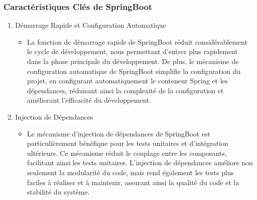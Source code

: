 \documentclass{article}
\begin{document}
\subsubsection{Caractéristiques Clés de SpringBoot}
\begin{enumerate}
    \item Démarrage Rapide et Configuration Automatique
    \begin{itemize}
        \item La fonction de démarrage rapide de SpringBoot réduit considérablement le cycle de développement, nous permettant d'entrer plus rapidement dans la phase principale du développement. De plus, le mécanisme de configuration automatique de SpringBoot simplifie la configuration du projet, en configurant automatiquement le conteneur Spring et les dépendances, réduisant ainsi la complexité de la configuration et améliorant l'efficacité du développement.
    \end{itemize}
    \item Injection de Dépendances
    \begin{itemize}
        \item Le mécanisme d'injection de dépendances de SpringBoot est particulièrement bénéfique pour les tests unitaires et d'intégration ultérieurs. Ce mécanisme réduit le couplage entre les composants, facilitant ainsi les tests unitaires. L'injection de dépendances améliore non seulement la modularité du code, mais rend également les tests plus faciles à réaliser et à maintenir, assurant ainsi la qualité du code et la stabilité du système.
    \end{itemize}
\end{enumerate}
\end{document}
